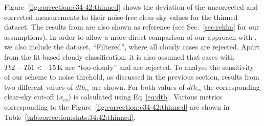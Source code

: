 \documentclass[12pt]{article}
\begin{document}
Figure~\ref{fig:correction:c34-42:thinned} shows the deviation of the uncorrected and
corrected measurements to their noise-free clear-sky values for the thinned dataset. The results from \cite{rekha2012potential} are also shown as reference (see Sec.~\ref{sec:rekha}
for our assumptions). In order to allow a more direct comparison of our
approach with \cite{rekha2012potential}, we also include the
dataset, ``Filtered'', where all cloudy cases are rejected. Apart from the fit
based cloudy classification, it is also assumed that cases with $Tb2-Tb1 < $
-15\,K are ``too-cloudy'' and are rejected.  To analyse the sensitivity of our scheme to noise threhold, as discussed in the previous section, results from two different values of $dtb_{cs}$ are shown. For both values of $dtb_{cs}$ the corresponding clear-sky cut-off
($x_{cs}$) is calculated using Eq~\ref{eq:dtb}. Various metrics corresponding to
the Figure~\ref{fig:correction:c34-42:thinned} are shown in
Table~\ref{tab:correction:stats:34:42:thinned}.
\end{document}
